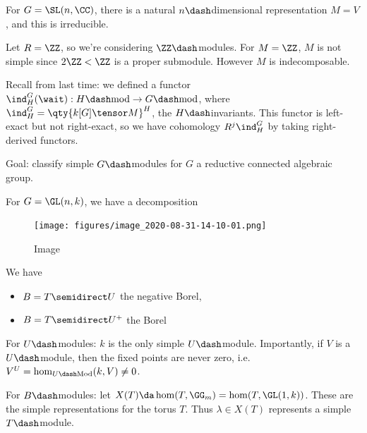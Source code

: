 \begin{example}

For \(G = \SL(n, \CC)\), there is a natural \(n\dash\)dimensional
representation \(M = V\), and this is irreducible.

\end{example}


\begin{example}

Let \(R = \ZZ\), so we're considering \(\ZZ\dash\)modules. For
\(M=\ZZ\), \(M\) is not simple since \(2\ZZ < \ZZ\) is a proper
submodule. However \(M\) is indecomposable.

\end{example}

Recall from last time: we defined a functor
\(\ind_H^G(\wait): H\dash\text{mod} \to G\dash\text{mod}\), where
\(\ind_H^G = \qty{k[G] \tensor M}^H\), the \(H\dash\)invariants. This
functor is left-exact but not right-exact, so we have cohomology
\(R^j \ind_H^G\) by taking right-derived functors.

Goal: classify simple \(G\dash\)modules for \(G\) a reductive connected
algebraic group.

\begin{example}

For \(G = \GL(n , k)\), we have a decomposition

\begin{figure}
\centering
\texttt{[image: figures/image\_2020-08-31-14-10-01.png]}
\caption{Image}
\end{figure}

\end{example}

We have

\begin{itemize}
\tightlist
\item
  \(B = T\semidirect U\) the negative Borel,
\item
  \(B = T\semidirect U^+\) the Borel
\end{itemize}

For \(U\dash\)modules: \(k\) is the only simple \(U\dash\)module.
Importantly, if \(V\) is a \(U\dash\)module, then the fixed points are
never zero, i.e.~\(V^U = \hom_{U\dash\text{Mod}}(k, V) \neq 0\).

For \(B\dash\)modules: let
\(X(T) \da \hom(T, \GG_m) = \hom(T, \GL(1, k))\). These are the simple
representations for the torus \(T\). Thus \(\lambda \in X(T)\)
represents a simple \(T\dash\)module.

